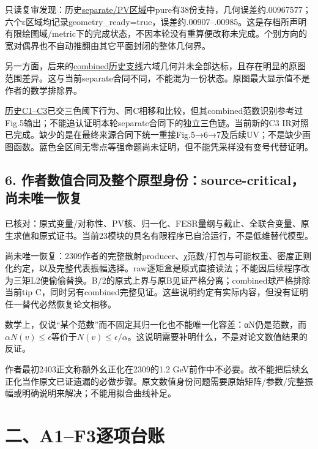 \documentclass[
  10pt,
  a4paper,
]{article}
\begin{document}
只读复审发现：历史\href{../../stage_B_delivery_20260907/regions/regions.json}{separate/PV区域}中pure有38份支持，几何误差约.00967577；六个ε区域均记录geometry\_ready=true，误差约.00907--.00985。这是存档所声明有限绘图域/metric下的完成状态，不因本轮没有重算便改称未完成。个别方向的宽对偶界也不自动推翻由其它平面封闭的整体几何界。

另一方面，后来的\href{../../mainline_alignment_20260909/B_combined/FIG4_CORE_CLAIMS_ZH.md}{combined历史支线}六域几何并未全部达标，且存在明显的原图范围差异。这与当前separate合同不同，不能混为一份状态。原图最大显示值不是作者的数学排除界。

\href{../../mainline_alignment_20260909/C_RESULT_ZH.md}{历史C1--C3}已交三色阈下行为、同C相移和比较，但其combined范数识别参考过Fig.5输出；不能追认证明本轮separate合同下的独立三色链。当前新的C3
IR对照已完成。缺少的是在最终来源合同下统一重接Fig.5→6→7及后续UV；不是缺少画图函数。蓝色全区间无零点等强命题尚未证明，但不能凭采样没有变号代替证明。

\subsection{6.
作者数值合同及整个原型身份：source-critical，尚未唯一恢复}\label{ux4f5cux8005ux6570ux503cux5408ux540cux53caux6574ux4e2aux539fux578bux8eabux4efdsource-criticalux5c1aux672aux552fux4e00ux6062ux590d}

已核对：原式变量/对称性、PV核、归一化、FESR量纲与截止、全联合变量、原生求值和原式证书。当前23模块的具名有限程序已自洽运行，不是低维替代模型。

尚未唯一恢复：2309作者的完整散射producer、χ范数/打包与可能权重、密度正则化约定，以及完整代表振幅选择。raw逐矩盒是原式直接读法；不能因后续程序改为三矩L2便偷偷替换。B/2的原式上界与原B见证严格分离；combined球严格排除当前tip
C，同时另有combined完整见证。这些说明约定有实际内容，但没有证明任一替代必然恢复论文相移。

数学上，仅说``某个范数''而不固定其归一化也不能唯一化容差：αN仍是范数，而\(\alpha N(v)\le\epsilon\)等价于\(N(v)\le\epsilon/\alpha\)。这说明需要补明什么，不是对论文数值结果的反证。

作者最初2403正文称额外幺正化在2309的1.2
GeV前作中不必要。故不能把后续幺正化当作原文已证遗漏的必做步骤。原文数值身份问题需要原始矩阵/参数/完整振幅或明确说明来解决；不能用拟合曲线补足。

\section{二、A1--F3逐项台账}\label{ux4e8ca1f3ux9010ux9879ux53f0ux8d26}
\end{document}
